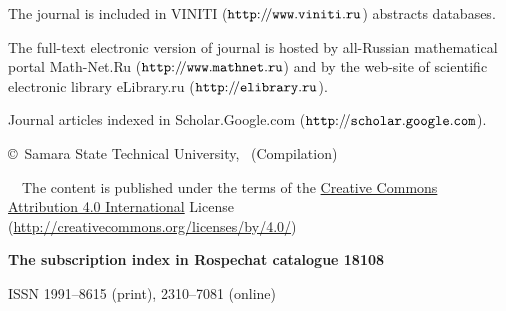 \begin{minipage}{12cm}
\par \smallskip
The journal is included in VINITI (\href{http://www.viniti.ru}{$\tt http{:}{/\!/}www.viniti.ru$}) abstracts databases.\par \smallskip
The full-text electronic version of journal is hosted by all-Russian mathematical portal Math-Net.Ru (\href{http://www.mathnet.ru}{$\tt http{:}{/\!/}www.mathnet.ru$}) and by the web-site of scientific electronic library eLibrary.ru (\href{http://elibrary.ru/title_about.asp?id=5784}{$\tt http{:}{/\!/}elibrary.ru$}). \par\smallskip
Journal articles indexed in Scholar.Google.com (\href{http://scholar.google.com/scholar?q=Vestn.+Samar.+Gos.+Tekhn.+Univ.+Ser.+Fiz.-Mat.+Nauki}{$\tt http{:}{/\!/}scholar.google.com$}).\par\medskip
\par \bigskip 
\copyright\ Samara State Technical University, \JournalYear\ (Compilation)\par\smallskip
\OAlogo~\ccby\ The content is published under the terms of the \href{http://creativecommons.org/licenses/by/4.0/}{Creative Commons \mbox{Attribution} 4.0 International} License (\url{http://creativecommons.org/licenses/by/4.0/})
\par \medskip \bf
The subscription index in Rospechat catalogue 18108\par \smallskip
ISSN 1991--8615 (print), 2310--7081 (online)  
\end{minipage}

\clearpage
\normalfont

\vsgtu{}
\rhead[]{\fancyplain{\RuJournalCont}{}}
\lhead[\fancyplain{\RuJournalCont}{}]{}
\cfoot[]{}
\lfoot[\thepage]{}
\rfoot[]{\thepage}
\renewcommand{\plainheadrulewidth}{0.7pt}
\renewcommand{\headrulewidth}{0.7pt}
\pagestyle{fancyplain}
\thispagestyle{plain}
\normalfont
\makecontents
\renewcommand{\baselinestretch}{0.9}

\newpage
\normalfont

\vsgtu{}
\rhead[]{\fancyplain{\EnJournalCont}{}}
\lhead[\fancyplain{\EnJournalCont}{}]{}
\cfoot[]{}
\lfoot[\thepage]{}
\rfoot[]{\thepage}
\renewcommand{\plainheadrulewidth}{0.7pt}
\renewcommand{\headrulewidth}{0.7pt}
\pagestyle{fancyplain}
\thispagestyle{plain}
\normalfont
\makeengcontents
\renewcommand{\baselinestretch}{0.9}

\newpage
\normalfont

